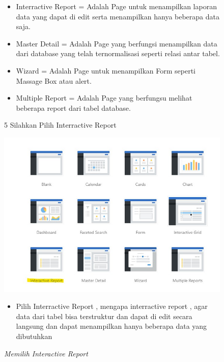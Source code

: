 \begin{itemize}
\begin{figure}[!htbp]
\begin{itemize}
            \item Interractive Report = Adalah Page untuk menampilkan laporan data yang dapat di edit serta menampilkan hanya beberapa data saja.
            \item Master Detail = Adalah Page yang berfungsi menampilkan data dari database yang telah ternormalisasi seperti relasi antar tabel.
            \item Wizard = Adalah Page untuk menampilkan Form seperti Massage Box atau alert.
            \item Multiple Report = Adalah Page yang berfungsu melihat beberapa report dari tabel database.
        \end{itemize}
        \end{figure}
        
        \begin{figure}[!htbp]
        
        \item[5]Silahkan Pilih Interractive Report
        \begin{center}
        \includegraphics[scale=0.6]{figures/pilih_interractive_report.jpg}
        \caption{\textit{Memilih Interactive Report}}
        \end{center}
                \begin{itemize}
            \item Pilih Interractive Report , mengapa interractive report , agar data dari tabel bisa terstruktur dan  dapat di edit secara langsung dan dapat menampilkan hanya beberapa data yang dibutuhkan
        \end{itemize}
        \end{figure}
        

\end{itemize}
